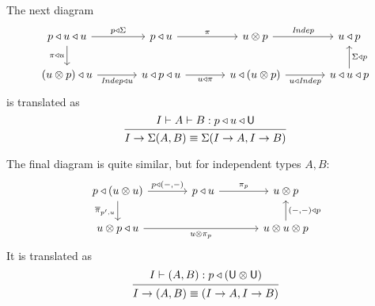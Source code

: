 \documentclass[11pt, one side, article]{memoir}
\theoremstyle{definition}
\theoremstyle{plain}
\newcommand{\Cat}[1]{\mathbf{#1}}%
\newcommand{\Fun}[1]{\mathit{#1}}%
\newcommand{\tn}[1]{\textnormal{#1}}
\newcommand{\ol}[1]{\overline{#1}}
\newcommand{\poly}{\Cat{Poly}}
\newcommand{\polycart}{\poly^{\Cat{Cart}}}
\newcommand{\0}{\textsf{0}}
\newcommand{\1}{\tn{\textsf{1}}}
\newcommand{\U}{\tn{\textsf{U}}}
\newcommand{\tri}{\mathbin{\triangleleft}}
\newcommand{\indep}{\Fun{Indep}}
\newcommand{\switch}{\pi}
\begin{document}
The next diagram
\[
\begin{tikzcd}[ampersand replacement=\&, column sep=large]
	p\tri u\tri u\ar[r, "p\tri\Sigma"]\ar[d, "\switch\tri u"']\&
	p\tri u\ar[r, "\switch"]\&
	u\otimes p\ar[r, "\indep"]\&
	u\tri p\\
	(u\otimes p)\tri u\ar[r, "\indep\tri u"']\&
	u\tri p\tri u\ar[r, "u\tri\switch"']\&
	u\tri (u\otimes p)\ar[r, "u\tri\indep"']\&
	u\tri u\tri p\ar[u, "\Sigma\tri p"']
\end{tikzcd}
\]
is translated as
\[
  \begin{prooftree}
    \Hypo{I\vdash A\vdash B : p\tri u\tri \U}
    \Infer1{I\to\Sigma(A,B)\equiv\Sigma(I\to A,I\to B)}
  \end{prooftree}
\]

The final diagram is quite similar, but for independent types $A,B$:
\[
\begin{tikzcd}[column sep=large, ampersand replacement=\&]
	p\tri (u\otimes u)\ar[d, "\ol{\switch}_{p',u}"']\ar[r, "p\tri{(-,-)}"]\&
	p\tri u\ar[r, "\switch_p"]\&u\otimes p\\
	u\otimes p\tri u\ar[rr, "u\otimes\switch_p"']\&\&
	u\otimes u\otimes p\ar[u, "{(-,-)}\tri p"']
\end{tikzcd}\label{eqn.key_med2}
\]
It is translated as
\[
  \begin{prooftree}
    \Hypo{I\vdash (A, B) : p\tri(\U\otimes\U)}
    \Infer1{I\to(A,B)\equiv(I\to A,I\to B)}
  \end{prooftree}
\]


%		










\printbibliography
\end{document}

